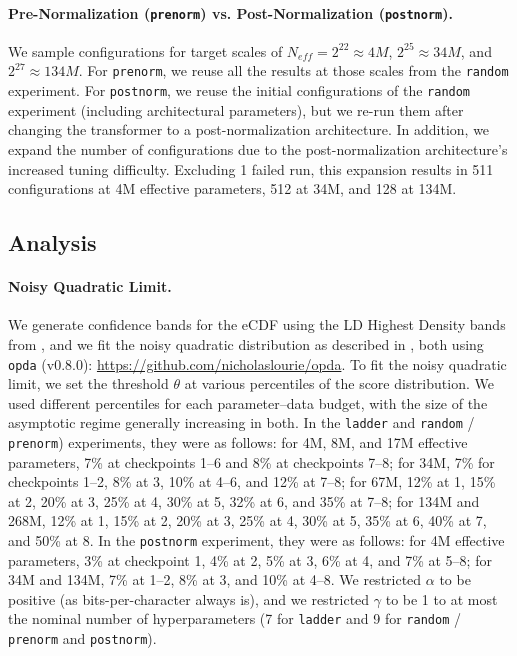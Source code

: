 \paragraph{Pre-Normalization (\texttt{prenorm}) vs. Post-Normalization (\texttt{postnorm}).} We sample configurations for target scales of $N_{eff} = 2^{22} \approx 4M$, $2^{25} \approx 34M$, and $2^{27} \approx 134M$. For \texttt{prenorm}, we reuse all the results at those scales from the \texttt{random} experiment. For \texttt{postnorm}, we reuse the initial configurations of the \texttt{random} experiment (including architectural parameters), but we re-run them after changing the transformer to a post-normalization architecture. In addition, we expand the number of configurations due to the post-normalization architecture's increased tuning difficulty. Excluding 1 failed run, this expansion results in 511 configurations at 4M effective parameters, 512 at 34M, and 128 at 134M.


\subsection{Analysis}
\label{app:experimental-design:analysis}

\paragraph{Noisy Quadratic Limit.} We generate confidence bands for the eCDF using the LD Highest Density bands from \citet{lourie-etal-2024-show}, and we fit the noisy quadratic distribution as described in \citet{lourie2025hyperparameter}, both using \texttt{opda} (v0.8.0): \url{https://github.com/nicholaslourie/opda}. To fit the noisy quadratic limit, we set the threshold $\theta$ at various percentiles of the score distribution. We used different percentiles for each parameter--data budget, with the size of the asymptotic regime generally increasing in both. In the \texttt{ladder} and \texttt{random} / \texttt{prenorm}) experiments, they were as follows: for 4M, 8M, and 17M effective parameters, 7\% at checkpoints 1--6 and 8\% at checkpoints 7--8; for 34M, 7\% for checkpoints 1--2, 8\% at 3, 10\% at 4--6, and 12\% at 7--8; for 67M, 12\% at 1, 15\% at 2, 20\% at 3, 25\% at 4, 30\% at 5, 32\% at 6, and 35\% at 7--8; for 134M and 268M, 12\% at 1, 15\% at 2, 20\% at 3, 25\% at 4, 30\% at 5, 35\% at 6, 40\% at 7, and 50\% at 8. In the \texttt{postnorm} experiment, they were as follows: for 4M effective parameters, 3\% at checkpoint 1, 4\% at 2, 5\% at 3, 6\% at 4, and 7\% at 5--8; for 34M and 134M, 7\% at 1--2, 8\% at 3, and 10\% at 4--8. We restricted $\alpha$ to be positive (as bits-per-character always is), and we restricted $\gamma$ to be 1 to at most the nominal number of hyperparameters (7 for \texttt{ladder} and 9 for \texttt{random} / \texttt{prenorm} and \texttt{postnorm}).


